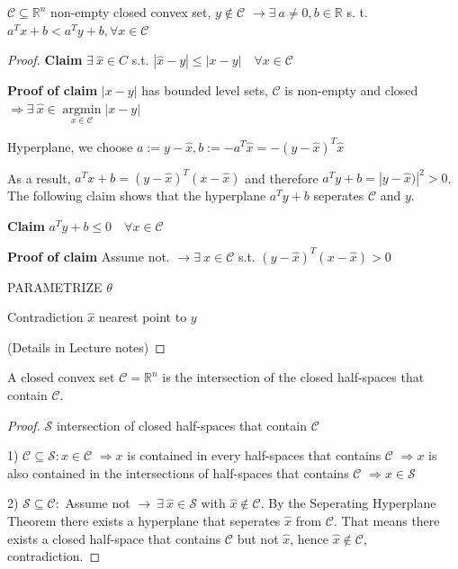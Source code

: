 \begin{theorem}
  $\mathcal{C} \subseteq \mathbb{R}^{n}$ non-empty closed convex set,
  $y \notin \mathcal{C}$
  $\rightarrow \exists\ a \ne 0, b \in \mathbb{R}$
  s. t. $a^T x + b < a^T y + b,
  \forall x \in \mathcal{C}$
\end{theorem}

\begin{proof}
  \textbf{Claim}
  $\exists\ \hat{x} \in C$ s.t. $|\hat{x}-y|\leq |x-y|\quad \forall x
  \in \mathcal{C}$

  \textbf{Proof of claim}
  $|x-y|$ has bounded level sets,
  $\mathcal{C}$ is non-empty and closed
  $\Rightarrow \exists\ \hat{x} \in \underset{x \in
  \mathcal{C}}{\operatorname{argmin}}|x-y|$

  Hyperplane, we choose $a:=y-\hat{x}, b:=-a^T\hat{x} = -(y-\hat{x})^T\hat{x}$

  As a result, $a^T x + b = (y-\hat{x})^T (x-\hat{x})$
and therefore $a^T y + b = |y-\hat{x})|^2 > 0$.
The following claim shows that the hyperplane $a^T y + b$ seperates
$\mathcal{C}$ and $y$.

\textbf{Claim}
$a^T y + b \le 0\quad \forall x \in \mathcal{C}$

\textbf{Proof of claim}
Assume not.
$\rightarrow \exists\ x \in \mathcal{C}$ s.t.
$(y-\hat{x})^T (x-\hat{x}) > 0$

PARAMETRIZE $\theta$

Contradiction $\hat{x}$ nearest point to $y$

(Details in Lecture notes)
\end{proof}

\begin{corollary}
A closed convex set $\mathcal{C} = \mathbb{R}^n$
is the intersection of the closed half-spaces
that contain $\mathcal{C}$.
\end{corollary}

\begin{proof}
$\mathcal{S}$ intersection of closed half-spaces that contain $\mathcal{C}$

1) $\mathcal{C} \subseteq \mathcal{S}: x \in \mathcal{C}$
$\Rightarrow x$ is contained in every half-spaces that contains $\mathcal{C}$
$\Rightarrow x$ is also contained in the intersections of half-spaces
that contains $\mathcal{C}$
$\Rightarrow x \in \mathcal{S}$

2) $\mathcal{S} \subseteq \mathcal{C}:$
Assume not
$\rightarrow\ \exists\ \hat{x}\in \mathcal{S}$
with $\hat{x}\notin \mathcal{C}$.
By the Seperating Hyperplane Theorem there exists a hyperplane
that seperates $\hat{x}$ from $\mathcal{C}$.
That means there exists a closed half-space
that contains $\mathcal{C}$ but not $\hat{x}$,
hence $\hat{x}\notin \mathcal{C}$, contradiction.
\end{proof}

